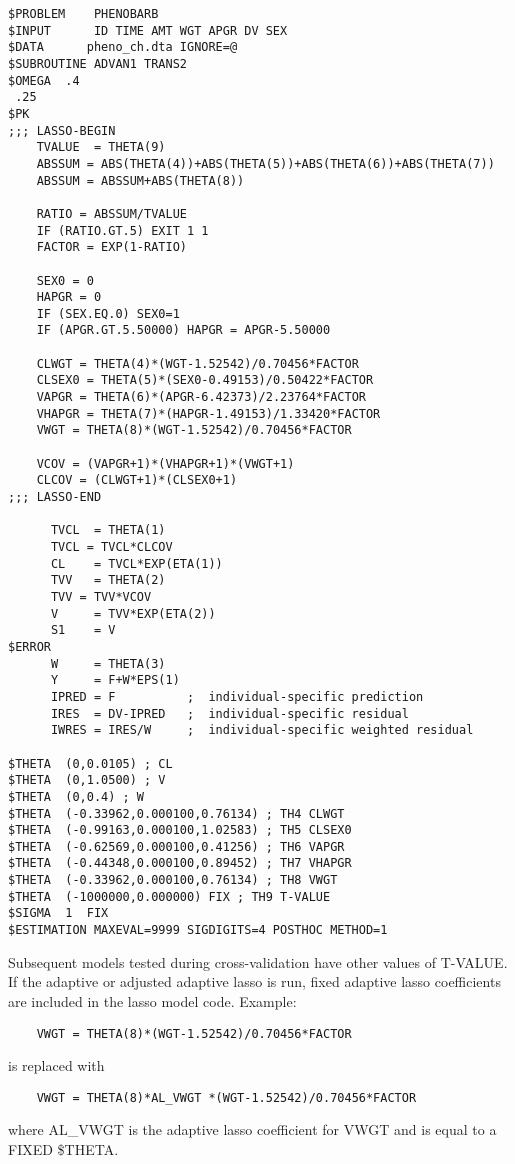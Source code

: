 \begin{verbatim}
$PROBLEM    PHENOBARB
$INPUT      ID TIME AMT WGT APGR DV SEX
$DATA      pheno_ch.dta IGNORE=@
$SUBROUTINE ADVAN1 TRANS2
$OMEGA  .4
 .25
$PK
;;; LASSO-BEGIN
    TVALUE  = THETA(9)
    ABSSUM = ABS(THETA(4))+ABS(THETA(5))+ABS(THETA(6))+ABS(THETA(7))
    ABSSUM = ABSSUM+ABS(THETA(8))

    RATIO = ABSSUM/TVALUE
    IF (RATIO.GT.5) EXIT 1 1
    FACTOR = EXP(1-RATIO)

    SEX0 = 0
    HAPGR = 0
    IF (SEX.EQ.0) SEX0=1
    IF (APGR.GT.5.50000) HAPGR = APGR-5.50000

    CLWGT = THETA(4)*(WGT-1.52542)/0.70456*FACTOR
    CLSEX0 = THETA(5)*(SEX0-0.49153)/0.50422*FACTOR
    VAPGR = THETA(6)*(APGR-6.42373)/2.23764*FACTOR
    VHAPGR = THETA(7)*(HAPGR-1.49153)/1.33420*FACTOR
    VWGT = THETA(8)*(WGT-1.52542)/0.70456*FACTOR

    VCOV = (VAPGR+1)*(VHAPGR+1)*(VWGT+1)
    CLCOV = (CLWGT+1)*(CLSEX0+1)
;;; LASSO-END

      TVCL  = THETA(1)
      TVCL = TVCL*CLCOV
      CL    = TVCL*EXP(ETA(1))
      TVV   = THETA(2)
      TVV = TVV*VCOV
      V     = TVV*EXP(ETA(2))
      S1    = V
$ERROR
      W     = THETA(3)
      Y     = F+W*EPS(1)
      IPRED = F          ;  individual-specific prediction
      IRES  = DV-IPRED   ;  individual-specific residual
      IWRES = IRES/W     ;  individual-specific weighted residual

$THETA  (0,0.0105) ; CL
$THETA  (0,1.0500) ; V
$THETA  (0,0.4) ; W
$THETA  (-0.33962,0.000100,0.76134) ; TH4 CLWGT
$THETA  (-0.99163,0.000100,1.02583) ; TH5 CLSEX0
$THETA  (-0.62569,0.000100,0.41256) ; TH6 VAPGR
$THETA  (-0.44348,0.000100,0.89452) ; TH7 VHAPGR
$THETA  (-0.33962,0.000100,0.76134) ; TH8 VWGT
$THETA  (-1000000,0.000000) FIX ; TH9 T-VALUE
$SIGMA  1  FIX
$ESTIMATION MAXEVAL=9999 SIGDIGITS=4 POSTHOC METHOD=1
\end{verbatim}

Subsequent models tested during cross-validation have other values of T-VALUE.
If the adaptive or adjusted adaptive lasso is run, fixed adaptive lasso coefficients are included in the lasso model 
code. Example:
\begin{verbatim}
    VWGT = THETA(8)*(WGT-1.52542)/0.70456*FACTOR
\end{verbatim}
is replaced with
\begin{verbatim}
    VWGT = THETA(8)*AL_VWGT *(WGT-1.52542)/0.70456*FACTOR
\end{verbatim}
where AL\_VWGT is the adaptive lasso coefficient for VWGT and is equal to a FIXED \$THETA. 

